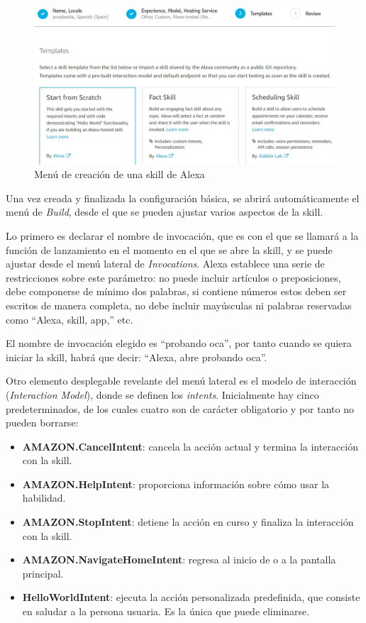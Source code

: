 \begin{figure}[H]
	\centering
	\includegraphics[width=1\textwidth]{imgs/alexa-dev-console-2.jpg}
	\caption{Menú de creación de una skill de Alexa}
	\label{fig:alexa-dev-console-2}
\end{figure}

Una vez creada y finalizada la configuración básica, se abrirá automáticamente el menú de \textit{Build}, desde el que se pueden ajustar varios aspectos de la skill.

Lo primero es declarar el nombre de invocación, que es con el que se llamará a la función de lanzamiento en el momento en el que se abre la skill, y se puede ajustar desde el menú lateral de \textit{Invocations}. Alexa establece una serie de restricciones sobre este parámetro: no puede incluir artículos o preposiciones, debe componerse de mínimo dos palabras, si contiene números estos deben ser escritos de manera completa, no debe incluir mayúsculas ni palabras reservadas como \enquote{Alexa, skill, app,} etc. 

El nombre de invocación elegido es \enquote{probando oca}, por tanto cuando se quiera iniciar la skill, habrá que decir: \enquote{Alexa, abre probando oca}.

Otro elemento desplegable revelante del menú lateral es el modelo de interacción (\textit{Interaction Model}), donde se definen los \textit{intents}. Inicialmente hay cinco predeterminados, de los cuales cuatro son de carácter obligatorio y por tanto no pueden borrarse:

\begin{itemize}
	\item \textbf{AMAZON.CancelIntent}: cancela la acción actual y termina la interacción con la skill.
	\item \textbf{AMAZON.HelpIntent}: proporciona información sobre cómo usar la habilidad.
	\item \textbf{AMAZON.StopIntent}: detiene la acción en curso y finaliza la interacción con la skill.
	\item \textbf{AMAZON.NavigateHomeIntent}: regresa al inicio de o a la pantalla principal.
	\item \textbf{HelloWorldIntent}: ejecuta la acción personalizada predefinida, que consiste en saludar a la persona usuaria. Es la única que puede eliminarse.
\end{itemize}

